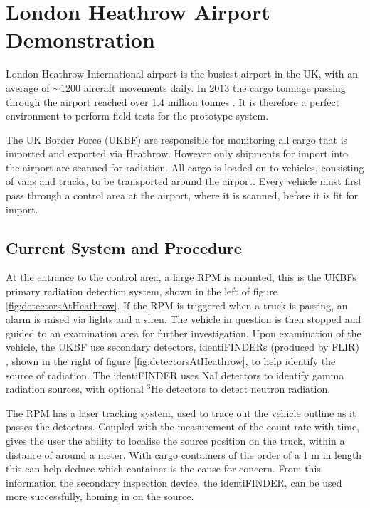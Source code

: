 \section{London Heathrow Airport Demonstration}
London Heathrow International airport is the busiest airport in the UK, with an average of $\sim$1200 aircraft movements daily. In 2013 the cargo tonnage passing through the airport reached over 1.4 million tonnes \cite{heathrowStats}. It is therefore a perfect environment to perform field tests for the prototype system.

The UK Border Force (UKBF) are responsible for monitoring all cargo that is imported and exported via Heathrow. However only shipments for import into the airport are scanned for radiation. All cargo is loaded on to vehicles, consisting of vans and trucks, to be transported around the airport. Every vehicle must first pass through a control area at the airport, where it is scanned, before it is fit for import. 

\subsection{Current System and Procedure}
At the entrance to the control area, a large RPM is mounted, this is the UKBFs primary radiation detection system, shown in the left of figure \ref{fig:detectorsAtHeathrow}. If the RPM is triggered when a truck is passing, an alarm is raised via lights and a siren. The vehicle in question is then stopped and guided to an examination area for further investigation. Upon examination of the vehicle, the UKBF use secondary detectors, identiFINDERs (produced by FLIR) \cite{identifinderFlir}, shown in the right of figure \ref{fig:detectorsAtHeathrow}, to help identify the source of radiation. The identiFINDER uses NaI detectors to identify gamma radiation sources, with optional $^{3}$He detectors to detect neutron radiation. 

The RPM has a laser tracking system, used to trace out the vehicle outline as it passes the detectors. Coupled with the measurement of the count rate with time, gives the user the ability to localise the source position on the truck, within a distance of around a meter. With cargo containers of the order of a 1 m in length this can help deduce which container is the cause for concern. From this information the secondary inspection device, the identiFINDER, can be used more successfully, homing in on the source. 

